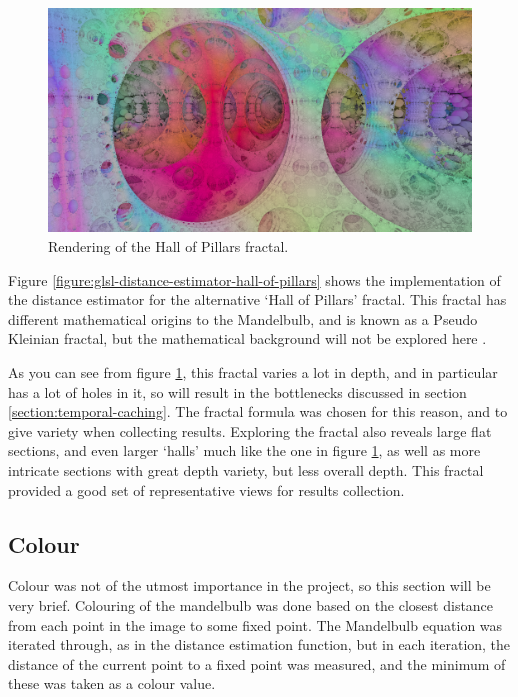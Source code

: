 \begin{figure}[ht]
	\centering
	\includegraphics[width=0.65\linewidth, frame]{Images/Hall-Of-Pillars-Example.png}
	\caption{Rendering of the Hall of Pillars fractal.}
	\label{figure:hall-of-pillars-example}
\end{figure}

Figure \ref{figure:glsl-distance-estimator-hall-of-pillars} shows the implementation of the distance estimator for the alternative `Hall of Pillars' fractal. This fractal has different mathematical origins to the Mandelbulb, and is known as a Pseudo Kleinian fractal, but the mathematical background will not be explored here \cite{pseudo-kleinian-fractals}.\newline

As you can see from figure \ref{figure:hall-of-pillars-example}, this fractal varies a lot in depth, and  in particular has a lot of holes in it, so will result in the bottlenecks discussed in section \ref{section:temporal-caching}. The fractal formula was chosen for this reason, and to give variety when collecting results. Exploring the fractal also reveals large flat sections, and even larger `halls' much like the one in figure \ref{figure:hall-of-pillars-example}, as well as more intricate sections with great depth variety, but less overall depth. This fractal provided a good set of representative views for results collection.

\subsection{Colour}

Colour was not of the utmost importance in the project, so this section will be very brief. Colouring of the mandelbulb was done based on the closest distance from each point in the image to some fixed point. The Mandelbulb equation was iterated through, as in the distance estimation function, but in each iteration, the distance of the current point to a fixed point was measured, and the minimum of these was taken as a colour value.\newline

